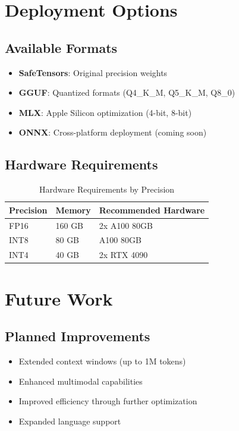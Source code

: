 \documentclass[11pt,a4paper]{article}
\begin{document}
\section{Deployment Options}

\subsection{Available Formats}
\begin{itemize}
    \item \textbf{SafeTensors}: Original precision weights
    \item \textbf{GGUF}: Quantized formats (Q4\_K\_M, Q5\_K\_M, Q8\_0)
    \item \textbf{MLX}: Apple Silicon optimization (4-bit, 8-bit)
    \item \textbf{ONNX}: Cross-platform deployment (coming soon)
\end{itemize}

\subsection{Hardware Requirements}
\begin{table}[H]
\centering
\begin{tabular}{lll}
\toprule
\textbf{Precision} & \textbf{Memory} & \textbf{Recommended Hardware} \\
\midrule
FP16 & 160 GB & 2x A100 80GB \\
INT8 & 80 GB & A100 80GB \\
INT4 & 40 GB & 2x RTX 4090 \\
\bottomrule
\end{tabular}
\caption{Hardware Requirements by Precision}
\end{table}

\section{Future Work}

\subsection{Planned Improvements}
\begin{itemize}
    \item Extended context windows (up to 1M tokens)
    \item Enhanced multimodal capabilities
    \item Improved efficiency through further optimization
    \item Expanded language support
\end{itemize}
\end{document}
